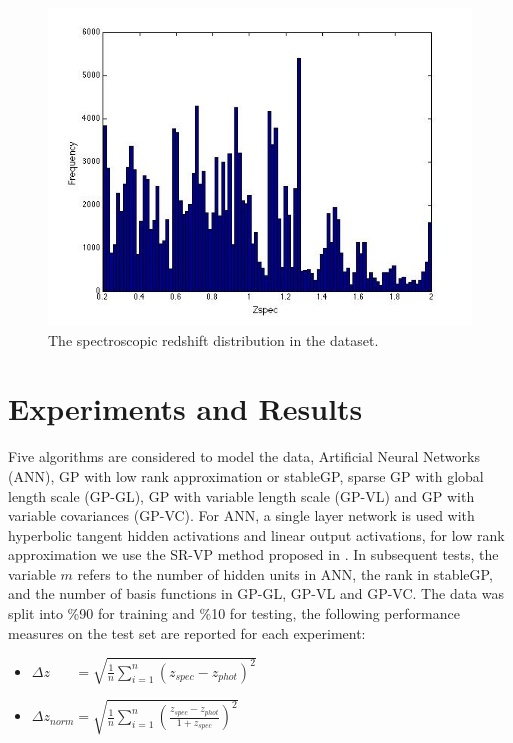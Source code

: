 \documentclass[useAMS,usenatbib,fleqn]{mn2e}
\begin{document}
\begin{figure}
       \centering
       \includegraphics[width=\columnwidth]{zpec.jpg}
        \caption{The spectroscopic redshift distribution in the dataset.} 
       \label{fig-zpec-hostogram}
\end{figure}

\section{Experiments and Results}
\label{sec-experiments}

Five algorithms are considered to model the data, Artificial Neural Networks (ANN), GP with low rank approximation or stableGP, sparse GP with global length scale (GP-GL), GP with variable length scale (GP-VL) and  GP with variable covariances (GP-VC). For ANN, a single layer network is used with hyperbolic tangent hidden activations and linear output activations, for low rank approximation we use the SR-VP method proposed in \cite{}. In subsequent tests, the variable $m$ refers to the number of hidden units in ANN, the rank in stableGP, and the number of basis functions in GP-GL, GP-VL and GP-VC. The data was split into \%90 for training and \%10 for testing, the following performance measures on the test set are reported for each experiment:

\begin{itemize}
  \item $\Delta z_{\phantom{norm}} = \sqrt{\frac{1}{n}\sum_{i=1}^{n}\left(z_{spec}-z_{phot}\right)^{2}}$
  \item $\Delta z_{norm} = \sqrt{\frac{1}{n}\sum_{i=1}^{n}\left(\frac{z_{spec}-z_{phot}}{1+z_{spec}}\right)^{2}}$
\end{itemize}
\end{document}
